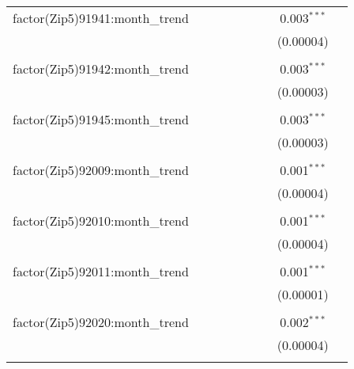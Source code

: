 \begin{table}[H]
{\begin{tabular}{@{\extracolsep{5pt}}lcccccccc}
  factor(Zip5)91941:month\_trend &  &  &  &  &  &  & 0.003$^{***}$ &  \\  

   &  &  &  &  &  &  & (0.00004) &  \\  

   & & & & & & & & \\  

  factor(Zip5)91942:month\_trend &  &  &  &  &  &  & 0.003$^{***}$ &  \\  

   &  &  &  &  &  &  & (0.00003) &  \\  

   & & & & & & & & \\  

  factor(Zip5)91945:month\_trend &  &  &  &  &  &  & 0.003$^{***}$ &  \\  

   &  &  &  &  &  &  & (0.00003) &  \\  

   & & & & & & & & \\  

  factor(Zip5)92009:month\_trend &  &  &  &  &  &  & 0.001$^{***}$ &  \\  

   &  &  &  &  &  &  & (0.00004) &  \\  

   & & & & & & & & \\  

  factor(Zip5)92010:month\_trend &  &  &  &  &  &  & 0.001$^{***}$ &  \\  

   &  &  &  &  &  &  & (0.00004) &  \\  

   & & & & & & & & \\  

  factor(Zip5)92011:month\_trend &  &  &  &  &  &  & 0.001$^{***}$ &  \\  

   &  &  &  &  &  &  & (0.00001) &  \\  

   & & & & & & & & \\  

  factor(Zip5)92020:month\_trend &  &  &  &  &  &  & 0.002$^{***}$ &  \\  

   &  &  &  &  &  &  & (0.00004) &  \\  

   & & & & & & & & \\  


\end{tabular}}
\end{table}
